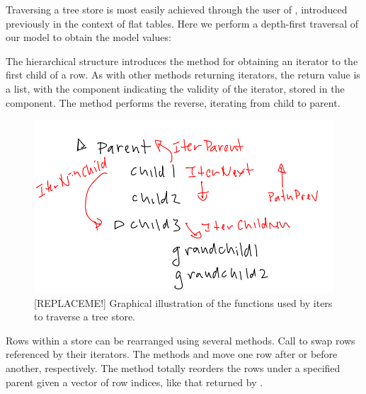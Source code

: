 Traversing a tree store is most easily achieved through the user of
, introduced previously in the context of flat
tables. Here we perform a depth-first traversal of our 
model to obtain the model values: 

\begin{Schunk}
\end{Schunk}
%
The hierarchical structure introduces the method
 for obtaining an iterator to the
first child of a row. As with other methods returning iterators, the
return value is a list, with the  component indicating
the validity of the iterator, stored in the  component. The
method  performs the reverse,
iterating from child to parent.

\begin{figure}
  \includegraphics[width=.7\textwidth]{traverse-tree}
  \caption{[REPLACEME!] Graphical illustration of the functions used
    by iters to traverse a tree store. }
  \label{fig:traverse-iter}
\end{figure}

Rows within a store can be rearranged using several methods. Call
 to swap rows referenced by their
iterators.  The methods  and
 move one row after or before
another, respectively.  The  method
totally reorders the rows under a specified parent given a vector of
row indices, like that returned by .

